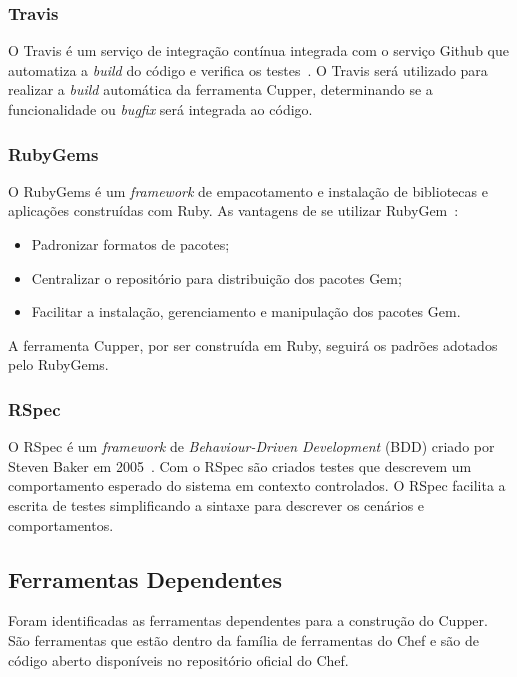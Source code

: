 \subsubsection{Travis}
\label{sec:supdev:travis}

O Travis é um serviço de integração contínua integrada com o serviço Github que automatiza
a \textit{build} do código e verifica os testes~\cite{travis:2016}. O Travis será utilizado para
realizar a \textit{build} automática da ferramenta Cupper, determinando se a funcionalidade ou \textit{bugfix}
será integrada ao código.

\subsubsection{RubyGems}
\label{sec:supdev:rubygems}

O RubyGems é um \textit{framework} de empacotamento e instalação de bibliotecas e aplicações
construídas com Ruby. As vantagens de se utilizar RubyGem~\cite{thomas:2001}:

\begin{itemize}
 \item Padronizar formatos de pacotes;
 \item Centralizar o repositório para distribuição dos pacotes Gem;
 \item Facilitar a instalação, gerenciamento e manipulação dos pacotes Gem.
\end{itemize}

A ferramenta Cupper, por ser construída em Ruby, seguirá os padrões adotados
pelo RubyGems.

\subsubsection{RSpec}
\label{sec:supdev:rspec}

O RSpec é um \textit{framework} de \textit{Behaviour-Driven Development} (BDD)
criado por Steven Baker em 2005~\cite{chelimsky:2010}. Com o RSpec
são criados testes que descrevem um comportamento esperado do sistema
em contexto controlados. O RSpec facilita a escrita de testes simplificando
a sintaxe para descrever os cenários e comportamentos.

\subsection{Ferramentas Dependentes}
\label{sec:deps}

Foram identificadas as ferramentas dependentes para a construção do Cupper.
São ferramentas que estão dentro da família de ferramentas do Chef e são
de código aberto disponíveis no repositório oficial do Chef.


